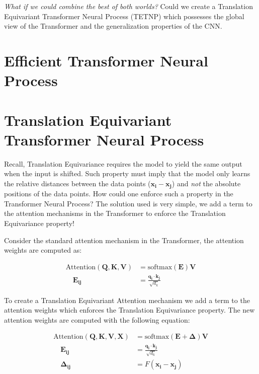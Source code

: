 \documentclass[../../main.tex]{subfiles}
\begin{document}
\emph{What if we could combine the best of both worlds?} Could we create a Translation Equivariant Transformer Neural Process (TETNP) which possesses the global view of the Transformer and the generalization properties of the CNN.


\section{Efficient Transformer Neural Process}



\section{Translation Equivariant Transformer Neural Process}
\label{sec:tetnp}

Recall, Translation Equivariance requires the model to yield the same output when the input is shifted. Such property must imply that the model only learns the relative distances between the data points ($\bm{x_i} - \bm{x_j}$) and \emph{not} the absolute positions of the data points. How could one enforce such a property in the Transformer Neural Process? The solution used is very simple, we add a term to the attention mechanisms in the Transformer to enforce the Translation Equivariance property!

Consider the standard attention mechanism in the Transformer, the attention weights are computed as:


\begin{align}
	\text{Attention}(\bm{Q}, \bm{K}, \bm{V}) &= \text{softmax}\left(\bm{E} \right) \bm{V}\\
	 \quad \bm{E_{ij}} &= \frac{\bm{q_i} \cdot \bm{k_j}}{\sqrt{d_k}}
\end{align}

To create a Translation Equivariant Attention mechanism we add a term to the attention weights which enforces the Translation Equivariance property. The new attention weights are computed with the following equation:

\begin{align}
	\label{eq:relative-attention}
	\text{Attention}(\bm{Q}, \bm{K}, \bm{V}, \bm{X}) &= \text{softmax}\left(\bm{E} + \bm{\Delta} \right) \bm{V}\\
	\quad \bm{E_{ij}} &= \frac{\bm{q_i} \cdot \bm{k_j}}{\sqrt{d_k}}\\
	 \quad \bm{\Delta_{ij}} &= F(\bm{x_i} - \bm{x_j})
\end{align}
\end{document}
